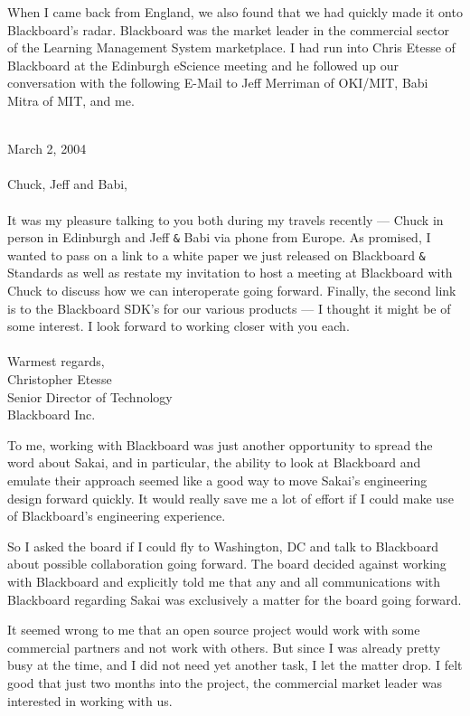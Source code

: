\documentclass[12pt]{book}
\begin{document}
When I came back from England, we also found that we had quickly
made it onto Blackboard's radar.  Blackboard was the market leader
in the commercial sector of the Learning Management System
marketplace.   I had run into Chris Etesse of Blackboard at the
Edinburgh eScience meeting and he followed up our conversation with
the following E-Mail to Jeff Merriman of OKI\slash MIT, Babi
Mitra of MIT, and me.\\
\\
\begin{sf}
March 2, 2004\\
\\
Chuck, Jeff and Babi,\\
\\
It was my pleasure talking to you both during my travels
recently --- Chuck in person in Edinburgh and Jeff \verb"&" Babi
via phone from Europe. As promised, I wanted to pass on
a link to a white paper we just released on Blackboard
\verb"&" Standards as well as restate my invitation to host a
meeting at Blackboard with Chuck to discuss how we can
interoperate going forward.  Finally, the second link
is to the Blackboard SDK's for our various products ---
I thought it might be of some interest. I look forward
to working closer with you each.\\
\\
Warmest regards,
\\
Christopher Etesse \\
Senior Director of Technology\\
Blackboard Inc. \\
\end{sf}
%

To me, working with Blackboard was just another
opportunity to spread the word about Sakai, and in particular,
the ability to look at Blackboard and emulate their
approach seemed like a good way to move Sakai's engineering design
forward quickly. It would really save me a lot of
effort if I could make use of Blackboard's engineering experience.

So I asked the board if I could fly to Washington, DC and talk to
Blackboard about possible collaboration going forward.  The
board decided against working
with Blackboard and explicitly told me
that any and all communications with Blackboard regarding
Sakai was exclusively a matter for the board going forward.

It seemed wrong to me that an open source project would work with
some commercial partners and not work with others.
But since I was already pretty busy at the time, and I did not need
yet another task, I let the matter drop.  I felt good that
just two months into the project, the commercial market leader
was interested in working with us.
\end{document}
